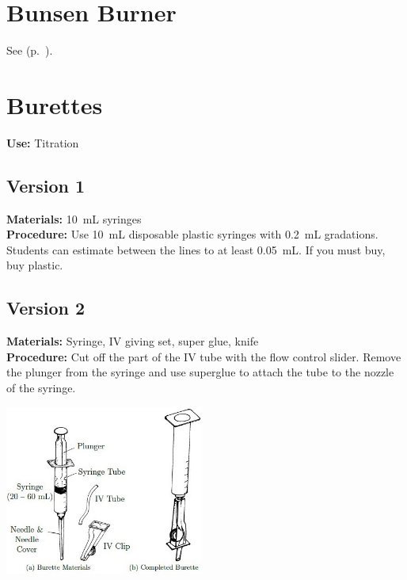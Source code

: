 \begin{multicols}{2}
\columnbreak


\section{Bunsen Burner}
\label{sec:bunsen-burner}
See  (p.~\pageref{sec:heatsources}).

\section{Burettes} 
\label{sec:burettes}
\vspace{-10pt}
\textbf{Use:} Titration

\subsection{Version 1}
\vspace{-6pt}
\textbf{Materials:} 10~mL syringes \\
\textbf{Procedure:} Use 10~mL disposable plastic syringes with 0.2~mL gradations. Students can estimate between the lines to at least 0.05~mL. If you must buy, buy plastic. 

\subsection{Version 2}
\vspace{-6pt}
\textbf{Materials:} Syringe, IV giving set, super glue, knife\\
\textbf{Procedure:} Cut off the part of the IV tube with the 
flow
control slider. Remove the plunger from the syringe and use superglue to
attach the tube to the nozzle of the syringe.
\begin{center}
\includegraphics[width=0.49\textwidth]{./img/burette.jpg}
\end{center}


\end{multicols}

